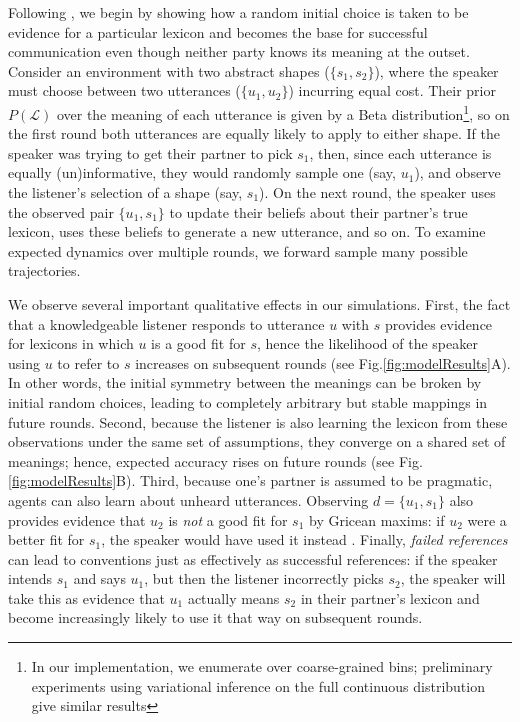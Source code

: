 Following \cite{SmithGoodmanFrank13_RecursivePragmaticReasoningNIPS}, we begin by showing how a random initial choice is taken to be evidence for a particular lexicon and becomes the base for successful communication even though neither party knows its meaning at the outset.
Consider an environment with two abstract shapes ($\{s_1, s_2\}$), where the speaker must choose between two utterances ($\{u_1, u_2\}$) incurring equal cost. 
Their prior $P(\mathcal{L})$ over the meaning of each utterance is given by a Beta distribution\footnote{In our implementation, we enumerate over coarse-grained bins; preliminary experiments using variational inference on the full continuous distribution give similar results}, so on the first round both utterances are equally likely to apply to either shape. 
If the speaker was trying to get their partner to pick $s_1$, then, since each utterance is equally (un)informative, they would randomly sample one (say, $u_1$), and observe the listener's selection of a shape (say, $s_1$). 
On the next round, the speaker uses the observed pair $\{u_1, s_1\}$ to update their beliefs about their partner's true lexicon, uses these beliefs to generate a new utterance, and so on. 
To examine expected dynamics over multiple rounds, we forward sample many possible trajectories.

We observe several important qualitative effects in our simulations. 
First, the fact that a knowledgeable listener responds to utterance $u$ with $s$ provides evidence for lexicons in which $u$ is a good fit for $s$, hence the likelihood of the speaker using $u$ to refer to $s$ increases on subsequent rounds (see Fig.\ref{fig:modelResults}A). 
In other words, the initial symmetry between the meanings can be broken by initial random choices, leading to completely arbitrary but stable mappings in future rounds. 
Second, because the listener is also learning the lexicon from these observations under the same set of assumptions, they converge on a shared set of meanings; hence, expected accuracy rises on future rounds (see Fig. \ref{fig:modelResults}B). 
Third, because one's partner is assumed to be pragmatic, agents can also learn about unheard utterances. 
Observing $d = \{u_1, s_1\}$ also provides evidence that $u_2$ is \emph{not} a good fit for $s_1$ by Gricean maxims: if $u_2$ were a better fit for $s_1$, the speaker would have used it instead \cite{Grice75_LogicConversation}. 
Finally, \emph{failed references} can lead to conventions just as effectively as successful references: if the speaker intends $s_1$ and says $u_1$, but then the listener incorrectly picks $s_2$, the speaker will take this as evidence that $u_1$ actually means $s_2$ in their partner's lexicon and become increasingly likely to use it that way on subsequent rounds.

